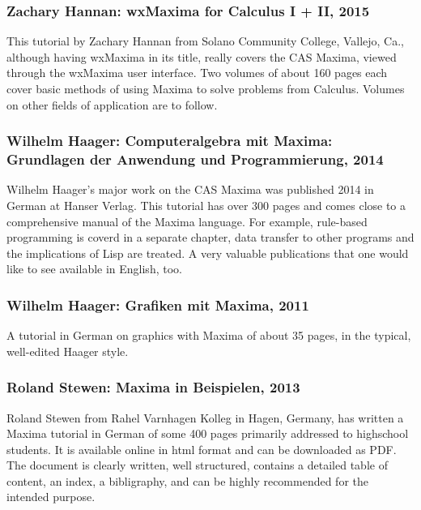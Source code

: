 \documentclass[../Maxima_Workbook.tex]{subfiles}
\begin{document}
\subsubsection{Zachary Hannan: wxMaxima for Calculus I + II, 2015}

This  tutorial by Zachary Hannan from Solano Community College, Vallejo, Ca., although having wxMaxima in its title, really covers the CAS Maxima, viewed through the wxMaxima user interface. Two volumes of about 160 pages each cover basic methods of using Maxima to solve problems from Calculus. Volumes on other fields of application are to follow.

\subsubsection{Wilhelm Haager: Computeralgebra mit Maxima: Grundlagen der Anwendung und Programmierung, 2014}

Wilhelm Haager's major work on the CAS Maxima was published 2014 in German at Hanser Verlag. This tutorial has over 300 pages and comes close to a comprehensive manual of the Maxima language. For example, rule-based programming is coverd in a separate chapter, data transfer to other programs and the implications of Lisp are treated. A very valuable publications that one would like to see available in English, too.

\subsubsection{Wilhelm Haager: Grafiken mit Maxima, 2011}

A tutorial in German on graphics with Maxima of about 35 pages, in the typical, well-edited Haager style.

\subsubsection{Roland Stewen: Maxima in Beispielen, 2013}

Roland Stewen from Rahel Varnhagen Kolleg in Hagen, Germany, has written a Maxima tutorial in German of some 400 pages primarily addressed to highschool students. It is available online in html format and can be downloaded as PDF. The document is clearly written, well structured, contains a detailed table of content, an index, a bibligraphy, and can be highly recommended for the intended purpose.
\end{document}
